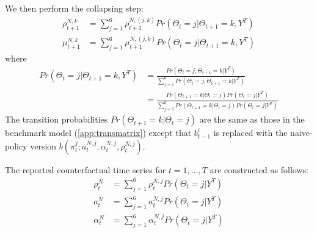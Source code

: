 \documentclass[12pt,letter,leqno]{article}
\theoremstyle{asn}
\theoremstyle{lem}
\theoremstyle{slem}
\theoremstyle{prop}
\theoremstyle{appprop}
\theoremstyle{rem}
\theoremstyle{defn}
\begin{document}
We then perform the collapsing step:
\begin{align*}
\rho^{N,k}_{t+1} &= \sum_{j=1}^6 \rho^{N,(j,k)}_{t+1} Pr(\Theta_t=j|\Theta_{t+1}=k,Y^T) \\
\mu^{N,k}_{t+1} &= \sum_{j=1}^6 \mu^{N,(j,k)}_{t+1} Pr(\Theta_t=j|\Theta_{t+1}=k,Y^T)
\end{align*}
where
\begin{align*}
Pr(\Theta_t=j|\Theta_{t+1}=k,Y^T) &= \frac{Pr(\Theta_t=j,\Theta_{t+1}=k|Y^T)}{\sum_{j=1}^6 Pr(\Theta_t=j,\Theta_{t+1}=k|Y^T) } \\
&=\frac{Pr(\Theta_{t+1}=k|\Theta_t=j)Pr(\Theta_t=j|Y^T)}{\sum_{j=1}^6 Pr(\Theta_{t+1}=k|\Theta_t=j)Pr(\Theta_t=j|Y^T) }
\end{align*}
The transition probabilities $Pr(\Theta_{t+1}=k|\Theta_t=j)$ are the same as those in the benchmark model (\ref{app:transmatrix}) except that $b_{t-1}^i$ is replaced with the naive-policy version $b(\pi_t^{j};a^{N,j}_t,\alpha^{N,j}_t,\rho^{N,j}_t)$.

The reported counterfactual time series for $t=1,\ldots,T$ are constructed as follows:
\begin{align*}
\rho^N_{t} &= \sum_{j=1}^6 \rho^{N,j}_{t}Pr(\Theta_{t}=j|Y^T) \\
a^N_{t} &= \sum_{j=1}^6 a^{N,j}_{t}Pr(\Theta_{t}=j|Y^T)\\
\alpha^N_{t} &= \sum_{j=1}^6 \alpha^{N,j}_{t}Pr(\Theta_{t}=j|Y^T)
\end{align*}







\end{document}
